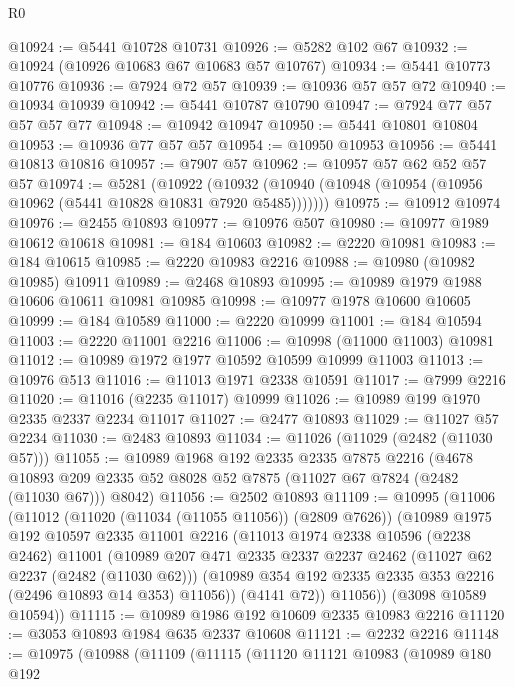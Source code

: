 \begin{lexlean}{R0}
\begin{coremodule}
@10924 := @5441 @10728 @10731
@10926 := @5282 @102 @67
@10932 := @10924 (@10926 @10683 @67 @10683 @57 @10767)
@10934 := @5441 @10773 @10776
@10936 := @7924 @72 @57
@10939 := @10936 @57 @57 @72
@10940 := @10934 @10939
@10942 := @5441 @10787 @10790
@10947 := @7924 @77 @57 @57 @57 @77
@10948 := @10942 @10947
@10950 := @5441 @10801 @10804
@10953 := @10936 @77 @57 @57
@10954 := @10950 @10953
@10956 := @5441 @10813 @10816
@10957 := @7907 @57
@10962 := @10957 @57 @62 @52 @57 @57
@10974 := @5281
    (@10922 (@10932 (@10940 (@10948 (@10954 (@10956 @10962 (@5441 @10828 @10831 @7920 @5485)))))))
@10975 := @10912 @10974
@10976 := @2455 @10893
@10977 := @10976 @507
@10980 := @10977 @1989 @10612 @10618
@10981 := @184 @10603
@10982 := @2220 @10981
@10983 := @184 @10615
@10985 := @2220 @10983 @2216
@10988 := @10980 (@10982 @10985) @10911
@10989 := @2468 @10893
@10995 := @10989 @1979 @1988 @10606 @10611 @10981 @10985
@10998 := @10977 @1978 @10600 @10605
@10999 := @184 @10589
@11000 := @2220 @10999
@11001 := @184 @10594
@11003 := @2220 @11001 @2216
@11006 := @10998 (@11000 @11003) @10981
@11012 := @10989 @1972 @1977 @10592 @10599 @10999 @11003
@11013 := @10976 @513
@11016 := @11013 @1971 @2338 @10591
@11017 := @7999 @2216
@11020 := @11016 (@2235 @11017) @10999
@11026 := @10989 @199 @1970 @2335 @2337 @2234 @11017
@11027 := @2477 @10893
@11029 := @11027 @57 @2234
@11030 := @2483 @10893
@11034 := @11026 (@11029 (@2482 (@11030 @57)))
@11055 := @10989
    @1968
    @192
    @2335
    @2335
    @7875
    @2216
    (@4678 @10893 @209 @2335 @52 @8028 @52 @7875 (@11027 @67 @7824 (@2482 (@11030 @67))) @8042)
@11056 := @2502 @10893
@11109 := @10995
    (@11006
      (@11012
        (@11020 (@11034 (@11055 @11056)) (@2809 @7626))
        (@10989
          @1975
          @192
          @10597
          @2335
          @11001
          @2216
          (@11013
            @1974
            @2338
            @10596
            (@2238 @2462)
            @11001
            (@10989
              @207
              @471
              @2335
              @2337
              @2237
              @2462
              (@11027 @62 @2237 (@2482 (@11030 @62)))
              (@10989 @354 @192 @2335 @2335 @353 @2216 (@2496 @10893 @14 @353) @11056))
            (@4141 @72))
          @11056))
      (@3098 @10589 @10594))
@11115 := @10989 @1986 @192 @10609 @2335 @10983 @2216
@11120 := @3053 @10893 @1984 @635 @2337 @10608
@11121 := @2232 @2216
@11148 := @10975
    (@10988
      (@11109
        (@11115
          (@11120
            @11121
            @10983
            (@10989
              @180
              @192

\end{coremodule}
\end{lexlean}
